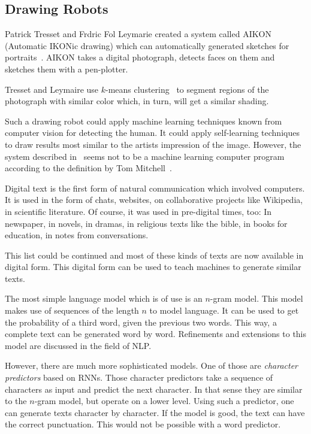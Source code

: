 \documentclass[technote,a4paper,leqno]{IEEEtran}
\begin{document}
\subsection{Drawing Robots}
Patrick Tresset and Frdric Fol Leymarie created a system called AIKON
(Automatic IKONic drawing) which can automatically generated sketches for
portraits~\cite{tresset2005generative}. AIKON takes a digital photograph,
detects faces on them and sketches them with a pen-plotter.

Tresset and Leymaire use $k$-means clustering~\cite{1017616} to segment regions
of the photograph with similar color which, in turn, will get a similar
shading.

Such a drawing robot could apply machine learning techniques known from
computer vision for detecting the human. It could apply self-learning
techniques to draw results most similar to the artists impression of the image.
However, the system described in~\cite{tresset2005generative} seems not to be a
machine learning computer program according to the definition by Tom
Mitchell~\cite{Mitchell97}.


Digital text is the first form of natural communication which involved
computers. It is used in the form of chats, websites, on collaborative projects
like Wikipedia, in scientific literature. Of course, it was used in pre-digital
times, too: In newspaper, in novels, in dramas, in religious texts like the
bible, in books for education, in notes from conversations.

This list could be continued and most of these kinds of texts are now available
in digital form. This digital form can be used to teach machines to generate
similar texts.

The most simple language model which is of use is an $n$-gram model. This model
makes use of sequences of the length $n$ to model language. It can be used to
get the probability of a third word, given the previous two words. This way, a
complete text can be generated word by word. Refinements and extensions to this
model are discussed in the field of \gls{NLP}.

However, there are much more sophisticated models. One of those are
\textit{character predictors} based on \glspl{RNN}. Those character predictors
take a sequence of characters as input and predict the next character. In that
sense they are similar to the $n$-gram model, but operate on a lower level.
Using such a predictor, one can generate texts character by character. If the
model is good, the text can have the correct punctuation. This would not be
possible with a word predictor.
\end{document}
